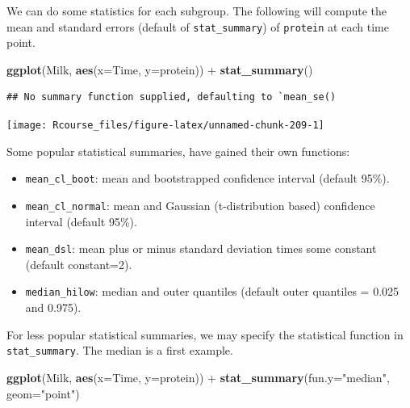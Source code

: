 \documentclass[]{book}
\newenvironment{Shaded}{\begin{snugshade}}{\end{snugshade}}
\newcommand{\KeywordTok}[1]{\textcolor[rgb]{0.13,0.29,0.53}{\textbf{{#1}}}}
\newcommand{\DataTypeTok}[1]{\textcolor[rgb]{0.13,0.29,0.53}{{#1}}}
\newcommand{\StringTok}[1]{\textcolor[rgb]{0.31,0.60,0.02}{{#1}}}
\newcommand{\NormalTok}[1]{{#1}}
\providecommand{\tightlist}{%
  \setlength{\itemsep}{0pt}\setlength{\parskip}{0pt}}
\theoremstyle{definition}
\theoremstyle{definition}
\theoremstyle{remark}
\begin{document}
We can do some statistics for each subgroup. The following will compute
the mean and standard errors (default of \texttt{stat\_summary}) of
\texttt{protein} at each time point.

\begin{Shaded}
\begin{Highlighting}[]
\KeywordTok{ggplot}\NormalTok{(Milk, }\KeywordTok{aes}\NormalTok{(}\DataTypeTok{x=}\NormalTok{Time, }\DataTypeTok{y=}\NormalTok{protein)) +}
\StringTok{  }\KeywordTok{stat_summary}\NormalTok{()}
\end{Highlighting}
\end{Shaded}

\begin{verbatim}
## No summary function supplied, defaulting to `mean_se()
\end{verbatim}

\texttt{[image: Rcourse\_files/figure-latex/unnamed-chunk-209-1]}

Some popular statistical summaries, have gained their own functions:

\begin{itemize}
\tightlist
\item
  \texttt{mean\_cl\_boot}: mean and bootstrapped confidence interval
  (default 95\%).
\item
  \texttt{mean\_cl\_normal}: mean and Gaussian (t-distribution based)
  confidence interval (default 95\%).
\item
  \texttt{mean\_dsl}: mean plus or minus standard deviation times some
  constant (default constant=2).
\item
  \texttt{median\_hilow}: median and outer quantiles (default outer
  quantiles = 0.025 and 0.975).
\end{itemize}

For less popular statistical summaries, we may specify the statistical
function in \texttt{stat\_summary}. The median is a first example.

\begin{Shaded}
\begin{Highlighting}[]
\KeywordTok{ggplot}\NormalTok{(Milk, }\KeywordTok{aes}\NormalTok{(}\DataTypeTok{x=}\NormalTok{Time, }\DataTypeTok{y=}\NormalTok{protein)) +}
\StringTok{  }\KeywordTok{stat_summary}\NormalTok{(}\DataTypeTok{fun.y=}\StringTok{"median"}\NormalTok{, }\DataTypeTok{geom=}\StringTok{"point"}\NormalTok{)}
\end{Highlighting}
\end{Shaded}
\end{document}
